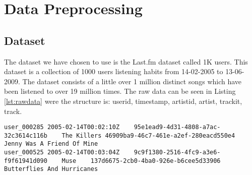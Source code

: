 \section{Data Preprocessing}
\subsection{Dataset}
The dataset we have chosen to use is the Last.fm\cite{lastfm} dataset called 1K users\parencite{lastfmdataset}. This dataset is a collection of 1000 users listening habits from 14-02-2005 to 13-06-2009. The dataset consists of a little over 1 million distinct songs which have been listened to over 19 million times. The raw data can be seen in Listing \ref{lst:rawdata} were the structure is: userid, timestamp, artistid, artist, trackit, track.

\begin{lstlisting}[caption={An example of the raw data from the 1K dataset},label=lst:rawdata]	
user_000285	2005-02-14T00:02:10Z	95e1ead9-4d31-4808-a7ac-32c3614c116b	The Killers	46909ba9-46c7-461e-a2ef-280eacd550e4	Jenny Was A Friend Of Mine
user_000525	2005-02-14T00:03:04Z	9c9f1380-2516-4fc9-a3e6-f9f61941d090	Muse	137d6675-2cb0-4ba0-926e-b6cee5d33906	Butterflies And Hurricanes
\end{lstlisting}